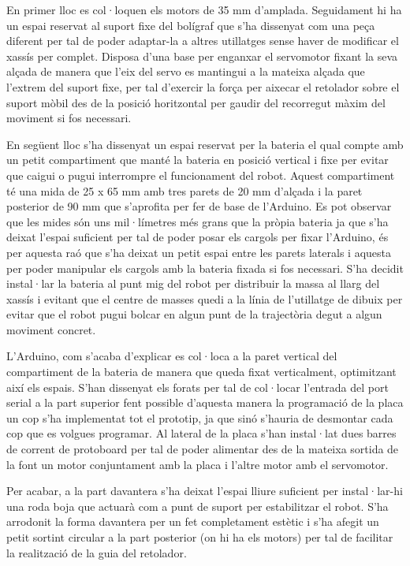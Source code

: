 En primer lloc es col·loquen els motors de 35 mm d'amplada. Seguidament hi ha un espai reservat al suport fixe del bolígraf que s’ha dissenyat com una peça diferent per tal de poder adaptar-la a altres utillatges sense haver de modificar el xassís per complet. Disposa d’una base per enganxar el servomotor fixant la seva alçada de manera que l’eix del servo es mantingui a la mateixa alçada que l’extrem del suport fixe, per tal d’exercir la força per aixecar el retolador sobre el suport mòbil des de la posició horitzontal per gaudir del recorregut màxim del moviment si fos necessari. 

En següent lloc s’ha dissenyat un espai reservat per la bateria el qual compte amb un petit compartiment que manté la bateria en posició vertical i fixe per evitar que caigui o pugui interrompre el funcionament del robot. Aquest compartiment té una mida de 25 x 65 mm amb tres parets de 20 mm d’alçada i la paret posterior de 90 mm que s’aprofita per fer de base de l’Arduino. Es pot observar que les mides són uns mil·límetres més grans que la pròpia bateria ja que s’ha deixat l’espai suficient per tal de poder posar els cargols per fixar l’Arduino, és per aquesta raó que s’ha deixat un petit espai entre les parets laterals i aquesta per poder manipular els cargols amb la bateria fixada si fos necessari. S’ha decidit instal·lar la bateria al punt mig del robot per distribuir la massa al llarg del xassís i evitant que el centre de masses quedi a la línia de l’utillatge de dibuix per evitar que el robot pugui bolcar en algun punt de la trajectòria degut a algun moviment concret.   

L’Arduino, com s’acaba d’explicar es col·loca a la paret vertical del compartiment de la bateria de manera que queda fixat verticalment, optimitzant així els espais. S’han dissenyat els forats per tal de col·locar l’entrada del port serial a la part superior fent possible d’aquesta manera la programació de la placa un cop s’ha implementat tot el prototip, ja que sinó s'hauria de desmontar cada cop que es volgues programar. Al lateral de la placa s’han instal·lat dues barres de corrent de protoboard per tal de poder alimentar des de la mateixa sortida de la font un motor conjuntament amb la placa i l’altre motor amb el servomotor. 

Per acabar, a la part davantera s’ha deixat l’espai lliure suficient per instal·lar-hi una roda boja que actuarà com a punt de suport per estabilitzar el robot. S'ha arrodonit la forma davantera per un fet completament estètic i s'ha afegit un petit sortint circular a la part posterior (on hi ha els motors) per tal de facilitar la realització de la guia del retolador.

